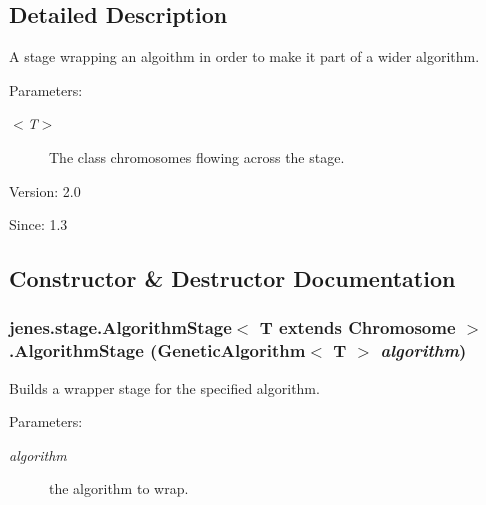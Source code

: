 \subsection{Detailed Description}
A stage wrapping an algoithm in order to make it part of a wider algorithm.

\begin{Desc}
\item[Parameters:]
\begin{description}
\item[{\em $<$T$>$}]The class chromosomes flowing across the stage.\end{description}
\end{Desc}
\begin{Desc}
\item[Version:]2.0 \end{Desc}
\begin{Desc}
\item[Since:]1.3 \end{Desc}


\subsection{Constructor \& Destructor Documentation}
\hypertarget{classjenes_1_1stage_1_1_algorithm_stage_3_01_t_01extends_01_chromosome_01_4_802871d36189757fc869c5a542dc1b9c}{
\subsubsection[AlgorithmStage]{\setlength{\rightskip}{0pt plus 5cm}jenes.stage.AlgorithmStage$<$ T extends Chromosome $>$.AlgorithmStage (GeneticAlgorithm$<$ T $>$ {\em algorithm})}}
\label{classjenes_1_1stage_1_1_algorithm_stage_3_01_t_01extends_01_chromosome_01_4_802871d36189757fc869c5a542dc1b9c}


Builds a wrapper stage for the specified algorithm.

\begin{Desc}
\item[Parameters:]
\begin{description}
\item[{\em algorithm}]the algorithm to wrap. \end{description}
\end{Desc}


